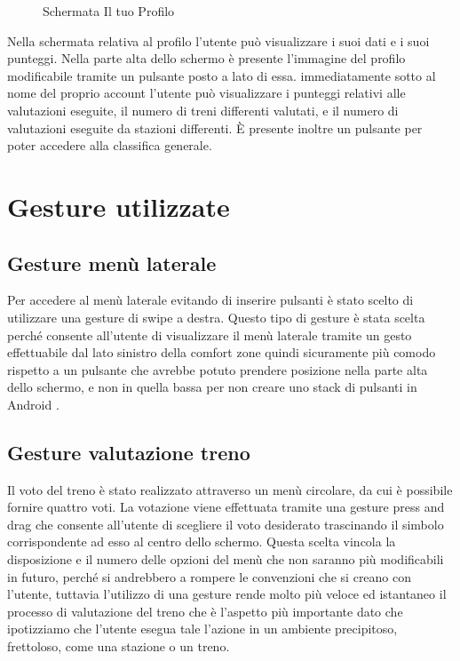 \begin{figure}[htp]
    \caption{Schermata Il tuo Profilo}
    \label{fig:ilTuoProfilo}
\end{figure}

Nella schermata relativa al profilo l'utente può visualizzare i suoi dati e i suoi punteggi. Nella parte alta dello schermo è presente l'immagine del profilo modificabile tramite un pulsante posto a lato di essa. immediatamente sotto al nome del proprio account l'utente può visualizzare i punteggi relativi alle valutazioni eseguite, il numero di treni differenti valutati, e il numero di valutazioni eseguite da stazioni differenti. È presente inoltre un pulsante per poter accedere alla classifica generale.

\section{Gesture utilizzate\label{sec:gesture}}

\subsection{Gesture menù laterale}
Per accedere al menù laterale evitando di inserire pulsanti è stato scelto di utilizzare una gesture di swipe a destra. Questo tipo di gesture è stata scelta perché consente all'utente di visualizzare il menù laterale tramite un gesto effettuabile dal lato sinistro della comfort zone quindi sicuramente più comodo rispetto a un pulsante che avrebbe potuto prendere posizione nella parte alta dello schermo, e non in quella bassa per non creare uno stack di pulsanti in Android \parencite{gaggi:mobileDesign}.

\subsection{Gesture valutazione treno}
Il voto del treno è stato realizzato attraverso un menù circolare, da cui è possibile fornire quattro voti. La votazione viene effettuata tramite una gesture press and drag che consente all'utente di scegliere il voto desiderato trascinando il simbolo corrispondente ad esso al centro dello schermo. 
Questa scelta vincola la disposizione e il numero delle opzioni del menù che non saranno più modificabili in futuro, perché si andrebbero a rompere le convenzioni che si creano con l'utente, tuttavia l'utilizzo di una gesture rende molto più veloce ed istantaneo il processo di valutazione del treno che è l'aspetto più importante dato che ipotizziamo che l'utente esegua tale l'azione in un ambiente precipitoso, frettoloso, come una stazione o un treno.   


